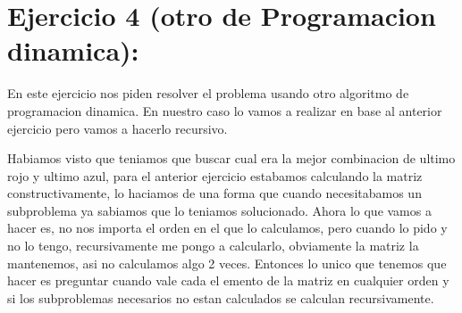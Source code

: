 \section{Ejercicio 4 (otro de Programacion dinamica):}

En este ejercicio nos piden resolver el problema usando otro algoritmo de programacion dinamica. En nuestro caso lo vamos a realizar en base al anterior ejercicio pero vamos a hacerlo recursivo.

Habiamos visto que teniamos que buscar cual era la mejor combinacion de ultimo rojo y ultimo azul, para el anterior ejercicio estabamos calculando la matriz constructivamente, lo haciamos de una forma que cuando necesitabamos un subproblema ya sabiamos que lo teniamos solucionado. Ahora lo que vamos a hacer es, no nos importa el orden en el que lo calculamos, pero cuando lo pido y no lo tengo, recursivamente me pongo a calcularlo, obviamente la matriz la mantenemos, asi no calculamos algo 2 veces. Entonces lo unico que tenemos que hacer es preguntar cuando vale cada el emento de la matriz en cualquier orden y si los subproblemas necesarios no estan calculados se calculan recursivamente.

\begin{algorithm}[H]
\NoCaptionOfAlgo
\end{algorithm}


